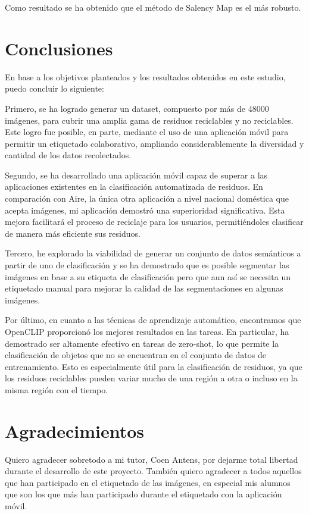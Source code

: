 \documentclass[10pt,a4paper,twocolumn,twoside]{article}
\begin{document}
Como resultado se ha obtenido que el método de Salency Map es el más robusto.

\section{Conclusiones}

En base a los objetivos planteados y los resultados obtenidos en este estudio, puedo concluir lo siguiente:

Primero, se ha logrado generar un dataset, compuesto por más de 48000 imágenes, para cubrir una amplia gama de residuos reciclables y no reciclables. Este logro fue posible, en parte, mediante el uso de una aplicación móvil para permitir un etiquetado colaborativo, ampliando considerablemente la diversidad y cantidad de los datos recolectados.

Segundo, se ha desarrollado una aplicación móvil capaz de superar a las aplicaciones existentes en la clasificación automatizada de residuos. En comparación con Aire, la única otra aplicación a nivel nacional doméstica que acepta imágenes, mi aplicación demostró una superioridad significativa. Esta mejora facilitará el proceso de reciclaje para los usuarios, permitiéndoles clasificar de manera más eficiente sus residuos.

Tercero, he explorado la viabilidad de generar un conjunto de datos semánticos a partir de uno de clasificación y se ha demostrado que es posible segmentar las imágenes en base a su etiqueta de clasificación pero que aun así se necesita un etiquetado manual para mejorar la calidad de las segmentaciones en algunas imágenes.

Por último, en cuanto a las técnicas de aprendizaje automático, encontramos que OpenCLIP proporcionó los mejores resultados en las tareas. En particular, ha demostrado ser altamente efectivo en tareas de zero-shot, lo que permite la clasificación de objetos que no se encuentran en el conjunto de datos de entrenamiento. Esto es especialmente útil para la clasificación de residuos, ya que los residuos reciclables pueden variar mucho de una región a otra o
incluso en la misma región con el tiempo.

\section*{Agradecimientos}

Quiero agradecer sobretodo a mi tutor, Coen Antens, por dejarme total libertad durante el desarrollo de este proyecto.
También quiero agradecer a todos aquellos que han participado en el etiquetado de las imágenes, en especial mis alumnos que son los que más han participado
durante el etiquetado con la aplicación móvil.
\end{document}
